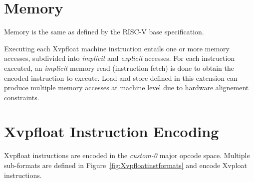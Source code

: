 \section{Memory}

Memory is the same as defined by the RISC-V base specification.

Executing each Xvpfloat machine instruction entails one or more memory accesses, subdivided into {\em implicit} and {\em explicit} accesses.
For each instruction executed, an {\em implicit} memory read (instruction fetch) is done to obtain the encoded instruction to execute.
Load and store defined in this extension can produce multiple memory accesses at machine level due to hardware alignement constraints.

\section{Xvpfloat Instruction Encoding}

Xvpfloat instructions are encoded in the {\em custom-0} major opcode space.
Multiple sub-formats are defined in Figure~\ref{fig:Xvpfloatinstformats} and encode Xvploat instructions.

